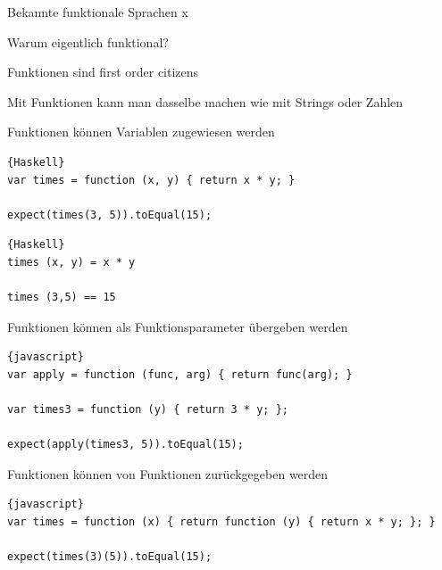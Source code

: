 \begin{frame}[fragile]{Bekannte funktionale Sprachen}
x
\end{frame}

\begin{frame}[fragile]{Warum eigentlich \glqq{}funktional\grqq{}?}

\begin{center}
\Large
Funktionen sind \glqq{}first order citizens\grqq{}
\end{center}

\vspace{2em}

\begin{center}
Mit Funktionen kann man dasselbe machen wie mit Strings oder Zahlen
\end{center}

\end{frame}

\begin{frame}[fragile]{Funktionen können Variablen zugewiesen werden}

\begin{lstlisting}{Haskell}
var times = function (x, y) { return x * y; }

expect(times(3, 5)).toEqual(15);
\end{lstlisting}

\begin{lstlisting}{Haskell}
times (x, y) = x * y

times (3,5) == 15
\end{lstlisting}

\end{frame}

\begin{frame}[fragile]{Funktionen können als Funktionsparameter übergeben werden}

\begin{lstlisting}{javascript}
var apply = function (func, arg) { return func(arg); }

var times3 = function (y) { return 3 * y; };

expect(apply(times3, 5)).toEqual(15);
\end{lstlisting}

\end{frame}

\begin{frame}[fragile]{Funktionen können von Funktionen zurückgegeben werden}

\begin{lstlisting}{javascript}
var times = function (x) { return function (y) { return x * y; }; }

expect(times(3)(5)).toEqual(15);
\end{lstlisting}

\end{frame}

